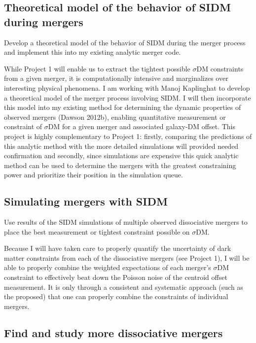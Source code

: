 {\subsection{Theoretical model of the behavior of SIDM during mergers}

Develop a theoretical model of the behavior of SIDM during the merger process and implement this into my existing analytic merger code. 

While Project 1 will enable us to extract the tightest possible $\sigma$DM  constraints from a given merger, it is computationally intensive and marginalizes over interesting physical phenomena.  I am working with Manoj Kaplinghat to develop a theoretical model of the merger process involving SIDM.  I will then incorporate this model into my existing method for determining the dynamic properties of observed mergers (Dawson 2012b), enabling quantitative measurement or constraint of $\sigma$DM  for a given merger and associated galaxy-DM offset.  This project is highly complementary to Project 1: firstly, comparing the predictions of this analytic method with the more detailed simulations will provided needed confirmation and secondly, since simulations are expensive this quick analytic method can be used to determine the mergers with the greatest constraining power and prioritize their position in the simulation queue.

\subsection{Simulating mergers with SIDM}

Use results of the SIDM simulations of multiple observed dissociative mergers to place the best measurement or tightest constraint possible on $\sigma$DM.  

Because I will have taken care to properly quantify the uncertainty of dark matter constraints from each of the dissociative mergers (see Project 1), I will be able to properly combine the weighted expectations of each merger’s $\sigma$DM  constraint to effectively beat down the Poisson noise of the centroid offset measurement.   It is only through a consistent and systematic approach (such as the proposed) that one can properly combine the constraints of individual mergers. 

\subsection{Find and study more dissociative mergers}

}
